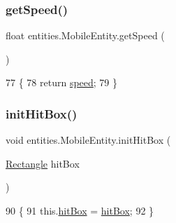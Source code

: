 \subsubsection{\texorpdfstring{get\+Speed()}{getSpeed()}}
{\footnotesize\ttfamily float entities.\+Mobile\+Entity.\+get\+Speed (\begin{DoxyParamCaption}{ }\end{DoxyParamCaption})\hspace{0.3cm}{\ttfamily [inline]}}


\begin{DoxyCode}
77                             \{
78         \textcolor{keywordflow}{return} \mbox{\hyperlink{classentities_1_1_mobile_entity_a815a9d2b23a0bb7e3ee7739d4c10d7c3}{speed}};
79     \}
\end{DoxyCode}
\mbox{\label{classentities_1_1_mobile_entity_ae57193cf5e05bde18c9b1e2bf22a8eb8}} 
\subsubsection{\texorpdfstring{init\+Hit\+Box()}{initHitBox()}}
{\footnotesize\ttfamily void entities.\+Mobile\+Entity.\+init\+Hit\+Box (\begin{DoxyParamCaption}\item[{\mbox{\hyperlink{classorg_1_1newdawn_1_1slick_1_1geom_1_1_rectangle}{Rectangle}}}]{hit\+Box }\end{DoxyParamCaption})\hspace{0.3cm}{\ttfamily [inline]}}


\begin{DoxyCode}
90                                              \{
91         this.\mbox{\hyperlink{classentities_1_1_mobile_entity_a996d583dcbf4fd5609e14ec87dbfa7a6}{hitBox}} = \mbox{\hyperlink{classentities_1_1_mobile_entity_a996d583dcbf4fd5609e14ec87dbfa7a6}{hitBox}};
92     \}
\end{DoxyCode}
\mbox{\label{classentities_1_1_mobile_entity_a3f9a4fa9cdc8d46f112acdad90888bcd}} 

